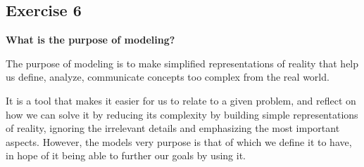 \documentclass{article}
\begin{document}
\subsection*{Exercise 6}
\textbf{What is the purpose of modeling?}

The purpose of modeling is to make simplified representations of reality that help us define, analyze, communicate concepts too complex from the real world. 

It is a tool that makes it easier for us to relate to a given problem, and reflect on how we can solve it by reducing its complexity by building simple representations of reality, ignoring the irrelevant details and emphasizing the most important aspects. However, the models very purpose is that of which we define it to have, in hope of it being able to further our goals by using it.
\end{document}
